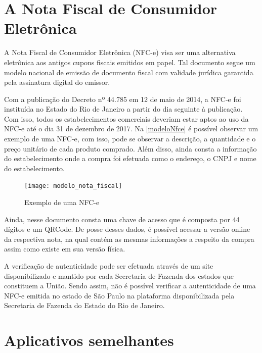 \section{A Nota Fiscal de Consumidor Eletrônica}\label{secNfce}

A Nota Fiscal de Consumidor Eletrônica (NFC-e) visa ser uma alternativa eletrônica aos antigos cupons fiscais emitidos em papel. Tal documento segue um modelo nacional de emissão de documento fiscal com validade jurídica garantida pela assinatura digital do emissor.

Com a publicação do Decreto nº 44.785 em 12 de maio de 2014, a NFC-e foi instituída no Estado do Rio de Janeiro a partir do dia seguinte à publicação. Com isso, todos os estabelecimentos comerciais deveriam estar aptos ao uso da NFC-e até o dia 31 de dezembro de 2017\cite{nfceDefinicao}. Na \autoref{modeloNfce} é possível observar um exemplo de uma NFC-e, com isso, pode se observar a descrição, a quantidade e o preço unitário de cada produto comprado. Além disso, ainda consta a informação do estabelecimento onde a compra foi efetuada como o endereço, o CNPJ e nome do estabelecimento.

\begin{figure}[h]
    \centering
    \caption{Exemplo de uma NFC-e}
    \texttt{[image: modelo\_nota\_fiscal]}
    \label{modeloNfce}
\end{figure}

Ainda, nesse documento consta uma chave de acesso que é composta por 44 dígitos e um QRCode. De posse desses dados, é possível acessar a versão online da respectiva nota, na qual contém as mesmas informações a respeito da compra assim como existe em sua versão física.


A verificação de autenticidade pode ser efetuada através de um site disponibilizado e mantido por cada Secretaria de Fazenda dos estados que constituem a União. Sendo assim, não é possível verificar a autenticidade de uma NFC-e emitida no estado de São Paulo na plataforma disponibilizada pela Secretaria de Fazenda do Estado do Rio de Janeiro.

\section{Aplicativos semelhantes}

